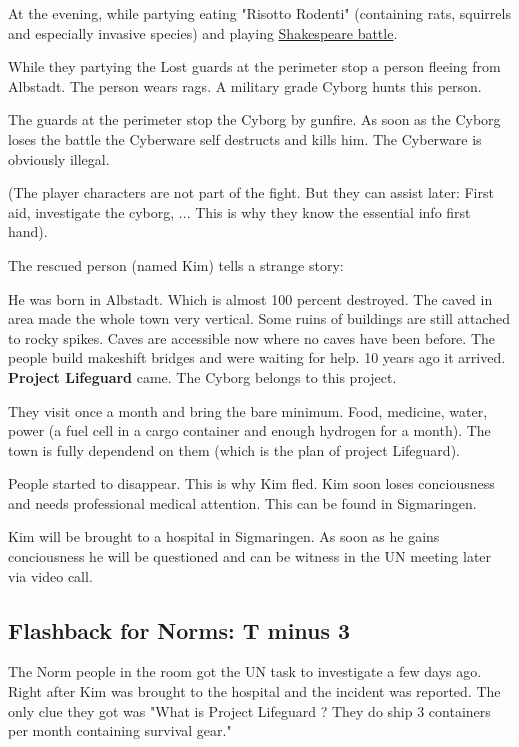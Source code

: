 At the evening, while partying eating "Risotto Rodenti" (containing rats, squirrels and especially invasive species) and playing \hyperref[sec:Shakespeare battle]{Shakespeare battle}.

While they partying the Lost guards at the perimeter stop a person fleeing from Albstadt. The person wears rags. A military grade Cyborg hunts this person.

The guards at the perimeter stop the Cyborg by gunfire. As soon as the Cyborg loses the battle the Cyberware self destructs and kills him. The Cyberware is obviously illegal.

(The player characters are not part of the fight. But they can assist later: First aid, investigate the cyborg, ... This is why they know the essential info first hand).

The rescued person (named Kim) tells a strange story:

He was born in Albstadt. Which is almost 100 percent destroyed. The caved in area made the whole town very vertical. Some ruins of buildings are still attached to rocky spikes. Caves are accessible now where no caves have been before. The people build makeshift bridges and were waiting for help. 10 years ago it arrived. \textbf{Project Lifeguard} came. The Cyborg belongs to this project.

They visit once a month and bring the bare minimum. Food, medicine, water, power (a fuel cell in a cargo container and enough hydrogen for a month). The town is fully dependend on them (which is the plan of project Lifeguard).

People started to disappear. This is why Kim fled. Kim soon loses conciousness and needs professional medical attention. This can be found in Sigmaringen.

Kim will be brought to a hospital in Sigmaringen. As soon as he gains conciousness he will be questioned and can be witness in the UN meeting later via video call.

\subsection{Flashback for Norms: T minus 3}

The Norm people in the room got the UN task to investigate a few days ago. Right after Kim was brought to the hospital and the incident was reported. The only clue they got was "What is Project Lifeguard ? They do ship 3 containers per month containing survival gear."

